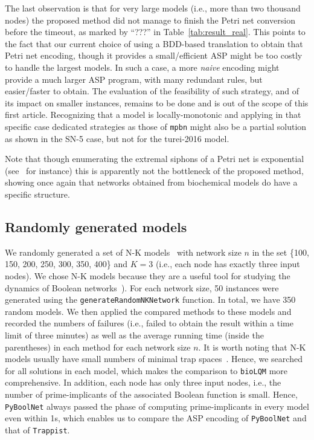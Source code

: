 \documentclass[preprint,12pt]{elsarticle}
\begin{document}
The last observation is that for very large models (i.e., more than two thousand nodes) the proposed method did not manage to finish the Petri net conversion before the timeout, as marked by ``???'' in Table~\ref{tab:result_real}.
This points to the fact that our current choice of using a BDD-based translation to obtain that Petri net encoding, though it provides a small/efficient ASP might be too costly to handle the largest models.
In such a case, a more \emph{naive} encoding might provide a much larger ASP program, with many redundant rules, but easier/faster to obtain.
The evaluation of the feasibility of such strategy, and of its impact on smaller instances, remains to be done and is out of the scope of this first article.
Recognizing that a model is locally-monotonic and applying in that specific case dedicated strategies as those of \texttt{mpbn} might also be a partial solution as shown in the SN-5 case, but not for the turei-2016 model.

Note that though enumerating the extremal siphons of a Petri net is exponential (see~\cite{nabli2016enumerating} for instance) this is apparently not the bottleneck of the proposed method, showing once again that networks obtained from biochemical models do have a specific structure.

\subsection{Randomly generated models}

We randomly generated a set of N-K models~\cite{glass1973logical} with network size \(n\) in the set \{100, 150, 200, 250, 300, 350, 400\} and \(K = 3\) (i.e., each node has exactly three input nodes).
We chose N-K models because they are a useful tool for studying the dynamics of Boolean networks~\cite{glass1973logical,klarner2015computing}).
For each network size, 50 instances were generated using the \verb|generateRandomNKNetwork| function.
In total, we have 350 random models. 
We then applied the compared methods to these models and recorded the numbers of failures (i.e., failed to obtain the result within a time limit of three minutes) as well as the average running time (inside the parentheses) in each method for each network size \(n\).
It is worth noting that N-K models usually have small numbers of minimal trap spaces~\cite{klarner2015computing}.
Hence, we searched for all solutions in each model, which makes the comparison to \texttt{bioLQM} more comprehensive.
In addition, each node has only three input nodes, i.e., the number of prime-implicants of the associated Boolean function is small.
Hence, \texttt{PyBoolNet} always passed the phase of computing prime-implicants in every model even within 1s, which enables us to compare the ASP encoding of \texttt{PyBoolNet} and that of \texttt{Trappist}.
\end{document}
